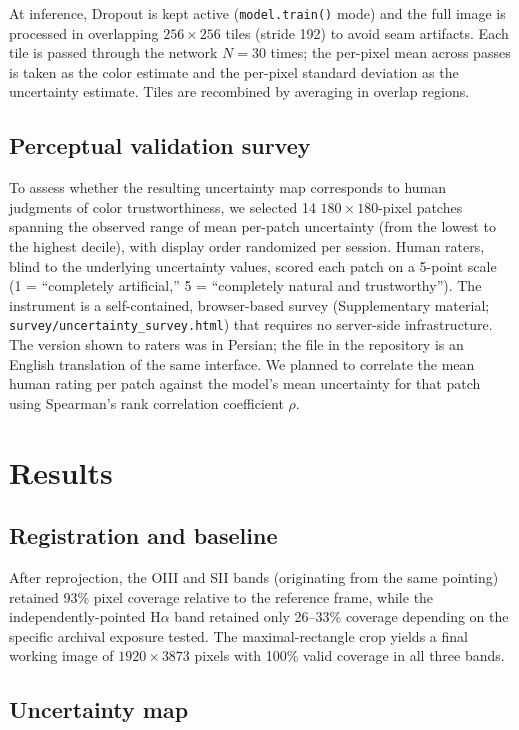 \documentclass[12pt]{article}
\begin{document}
At inference, Dropout is kept active (\texttt{model.train()} mode) and the
full image is processed in overlapping $256\times256$ tiles (stride 192) to
avoid seam artifacts. Each tile is passed through the network $N=30$ times;
the per-pixel mean across passes is taken as the color estimate and the
per-pixel standard deviation as the uncertainty estimate. Tiles are
recombined by averaging in overlap regions.

\subsection{Perceptual validation survey}

To assess whether the resulting uncertainty map corresponds to human
judgments of color trustworthiness, we selected 14 $180\times180$-pixel
patches spanning the observed range of mean per-patch uncertainty (from the
lowest to the highest decile), with display order randomized per session.
Human raters, blind to the underlying uncertainty values, scored each patch
on a 5-point scale (1 = ``completely artificial,'' 5 = ``completely natural
and trustworthy''). The instrument is a self-contained, browser-based
survey (Supplementary material; \texttt{survey/uncertainty\_survey.html})
that requires no server-side infrastructure. The version shown to raters was in Persian; the file in the repository is an English translation of the same interface. We planned to correlate the
mean human rating per patch against the model's mean uncertainty for that
patch using Spearman's rank correlation coefficient $\rho$.

\section{Results}

\subsection{Registration and baseline}

After reprojection, the OIII and SII bands (originating from the same
pointing) retained 93\% pixel coverage relative to the reference frame,
while the independently-pointed H$\alpha$ band retained only 26--33\%
coverage depending on the specific archival exposure tested. The
maximal-rectangle crop yields a final working image of
$1920\times3873$ pixels with 100\% valid coverage in all three bands.

\subsection{Uncertainty map}
\end{document}
